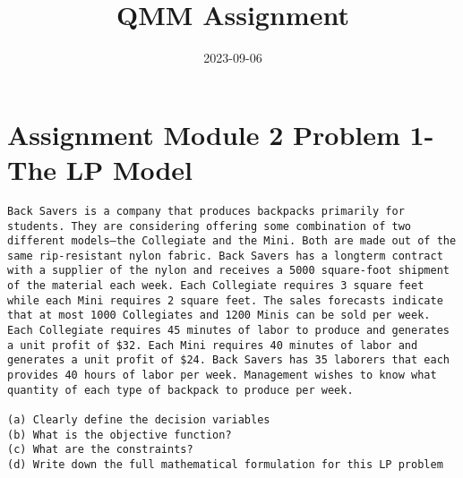 \documentclass[
]{article}
\title{QMM Assignment}
\author{}
\date{\vspace{-2.5em}2023-09-06}
\newenvironment{Shaded}{\begin{snugshade}}{\end{snugshade}}
\newcommand{\AttributeTok}[1]{\textcolor[rgb]{0.13,0.29,0.53}{#1}}
\newcommand{\ConstantTok}[1]{\textcolor[rgb]{0.56,0.35,0.01}{#1}}
\newcommand{\DecValTok}[1]{\textcolor[rgb]{0.00,0.00,0.81}{#1}}
\newcommand{\FunctionTok}[1]{\textcolor[rgb]{0.13,0.29,0.53}{\textbf{#1}}}
\newcommand{\NormalTok}[1]{#1}
\newcommand{\OtherTok}[1]{\textcolor[rgb]{0.56,0.35,0.01}{#1}}
\newcommand{\StringTok}[1]{\textcolor[rgb]{0.31,0.60,0.02}{#1}}
\begin{document}
\maketitle

\hypertarget{assignment-module-2-problem-1--the-lp-model}{%
\section{Assignment Module 2 Problem 1- The LP
Model}\label{assignment-module-2-problem-1--the-lp-model}}

\begin{verbatim}
Back Savers is a company that produces backpacks primarily for students. They are considering offering some combination of two different models—the Collegiate and the Mini. Both are made out of the same rip-resistant nylon fabric. Back Savers has a longterm contract with a supplier of the nylon and receives a 5000 square-foot shipment of the material each week. Each Collegiate requires 3 square feet while each Mini requires 2 square feet. The sales forecasts indicate that at most 1000 Collegiates and 1200 Minis can be sold per week. Each Collegiate requires 45 minutes of labor to produce and generates a unit profit of $32. Each Mini requires 40 minutes of labor and generates a unit profit of $24. Back Savers has 35 laborers that each provides 40 hours of labor per week. Management wishes to know what quantity of each type of backpack to produce per week.

(a) Clearly define the decision variables
(b) What is the objective function?
(c) What are the constraints?
(d) Write down the full mathematical formulation for this LP problem
\end{verbatim}

\begin{Shaded}
\end{Shaded}
\end{document}

